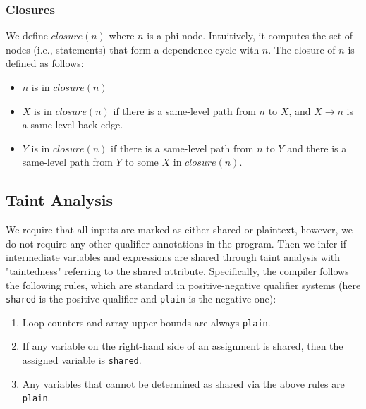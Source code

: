 \subsubsection{Closures}

We define $\mathit{closure}(n)$ where $n$ is a phi-node. Intuitively, it computes the set of nodes (i.e., statements) that form a dependence cycle with $n$. The closure of $n$ is defined as follows:
\begin{itemize}
\item $n$ is in $\mathit{closure}(n)$
\item $X$ is in $\mathit{closure}(n)$ if there is a same-level path from $n$ to $X$, and $X \rightarrow n$ is a same-level back-edge.
\item $Y$ is in $\mathit{closure}(n)$ if there is a same-level path from $n$ to $Y$ and there is a same-level path from $Y$ to some $X$ in $\mathit{closure}(n)$.
\end{itemize}

\subsection{Taint Analysis}

We require that all inputs are marked as either shared or plaintext, however, we do not require any other qualifier annotations in the program. Then we infer if intermediate variables and expressions are shared through taint analysis with "taintedness" referring to the shared attribute.  Specifically, the compiler follows the following rules, which are standard in positive-negative qualifier systems (here \texttt{shared} is the positive qualifier and \texttt{plain} is the negative one):
\begin{enumerate}
\item Loop counters and array upper bounds are always \texttt{plain}.
\item If any variable on the right-hand side of an assignment is shared, then the assigned variable is \texttt{shared}.
\item Any variables that cannot be determined as shared via the above rules are \texttt{plain}.
\end{enumerate}

